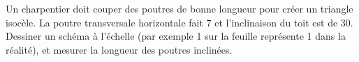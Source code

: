 
\begin{exercice}\label{exosmath-0779}

    Un charpentier doit couper des poutres de bonne longueur pour créer un triangle isocèle. La poutre transversale horizontale fait \unit{7}{\meter} et l'inclinaison du toit est de \unit{30}{\degree}. Dessiner un schéma à l'échelle (par exemple \unit{1}{\centi\meter} sur la feuille représente \unit{1}{\meter} dans la réalité), et mesurer la longueur des poutres inclinées.

\end{exercice}
